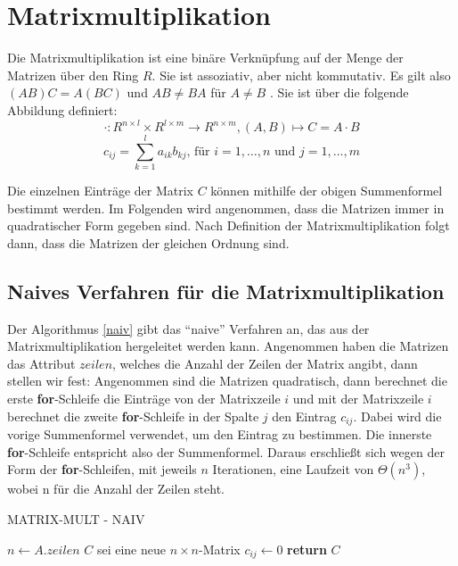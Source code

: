 \section{Matrixmultiplikation}
\label{sec:abschn2}
Die Matrixmultiplikation ist eine binäre Verknüpfung auf der Menge der Matrizen über den Ring $R$. Sie ist assoziativ, aber nicht kommutativ. Es gilt also $(AB)C = A(BC)$ und $AB \neq BA$ für $A \neq B$ \cite{Fischer2014}.
Sie ist über die folgende Abbildung definiert: 
\[
\cdot: R^{n\times l} \times R^{l\times m} \rightarrow R^{n\times m}, (A, B) \mapsto C = A \cdot B
\]
\[
c_{ij} = \sum_{k=1}^{l} a_{ik}b_{kj} \text{, für }i = 1, \dots, n \text{ und }j = 1, \dots, m
\]

Die einzelnen Einträge der Matrix $C$ können mithilfe der obigen Summenformel bestimmt werden. Im Folgenden wird angenommen, dass die Matrizen immer in quadratischer Form gegeben sind. Nach Definition der Matrixmultiplikation folgt dann, dass die Matrizen der gleichen Ordnung sind. 
\subsection{Naives Verfahren für die Matrixmultiplikation}
Der Algorithmus \ref{naiv} gibt das \enquote{naive} Verfahren an, das aus der Matrixmultiplikation hergeleitet werden kann. Angenommen haben die Matrizen das Attribut $zeilen$, welches die Anzahl der Zeilen der Matrix angibt, dann stellen wir fest:
Angenommen sind die Matrizen quadratisch, dann berechnet die erste \textbf{for}-Schleife die Einträge von der Matrixzeile $i$ und mit der Matrixzeile $i$ berechnet die zweite \textbf{for}-Schleife in der Spalte $j$ den Eintrag $c_{ij}$. Dabei wird die vorige Summenformel verwendet, um den Eintrag zu bestimmen. Die innerste \textbf{for}-Schleife entspricht also der Summenformel. Daraus erschließt sich wegen der Form der \textbf{for}-Schleifen, mit jeweils $n$ Iterationen, eine Laufzeit von $\Theta(n^3)$, wobei n für die Anzahl der Zeilen steht. 
\begin{algorithm}[hbt!]
\begin{algorithmic}[1]
\caption{MATRIX-MULT - NAIV}
\label{naiv}
    \State $n\gets A.zeilen$
    \State $C$ sei eine neue $n\times n$-Matrix
            \State $c_{ij} \gets 0$
            \EndFor
        \EndFor
    \EndFor
    \State \textbf{return} $C$ 
\EndProcedure
\end{algorithmic}
\end{algorithm}

